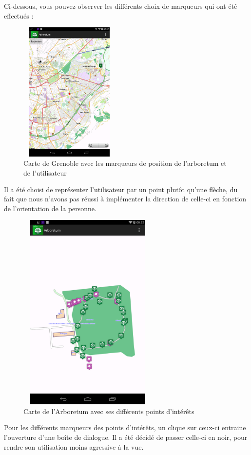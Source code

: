 \documentclass[a4paper,11pt]{article}
\begin{document}
			Ci-dessous, vous pouvez observer les différents choix de marqueurs qui ont été effectués : %
    \begin{figure}[H]
     \begin{center}
      \includegraphics[width=5cm,height=7cm]{grenoble.png}
      \caption{Carte de Grenoble avec les marqueurs de position de l'arboretum et de l'utilisateur}
     \end{center}
    \end{figure}
			Il a été choisi de représenter l'utilisateur par un point plutôt qu'une flèche, du fait que nous n'avons pas réussi à implémenter la direction de celle-ci en fonction de l'orientation de la personne.
     \begin{figure}[H]
     \begin{center}
      \includegraphics[width=7cm,height=10cm]{arbo.png}
      \caption{Carte de l'Arboretum avec ses différents points d'intérêts}
     \end{center}
    \end{figure}
			Pour les différents marqueurs des points d'intérêts, un clique sur ceux-ci entraine l'ouverture d'une boîte de dialogue. 
			Il a été décidé de passer celle-ci en noir, pour rendre son utilisation moins agressive à la vue. 
			
\end{document}
